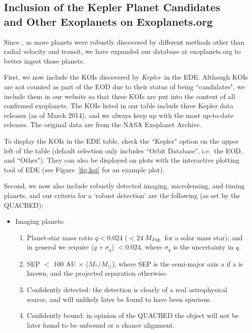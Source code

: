 \documentclass[11pt,preprint]{aastex}
\def\kepler{\textit{Kepler}}
\def\mjup{$M_{\rm Jup}$}
\begin{document}
\begin{CJK*}{UTF8}{gbsn}
\section{Inclusion of the Kepler Planet Candidates \\
  and Other Exoplanets on Exoplanets.org}\label{sec:kepler}

Since \cite{Wright2011}, as more planets were robustly discovered by
different methods other than radial velocity and transit, we have
expanded our database at exoplanets.org to better ingest those
planets.

First, we now include the KOIs discovered by \kepler\ in the
EDE. Although KOIs are not counted as part of the EOD due to their
status of being ``candidates", we include them in our website so that
these KOIs are put into the context of all confirmed exoplanets. The
KOIs listed in our table include three Kepler data releases (as of
March 2014), and we always keep up with the most up-to-date
releases. The original data are from the NASA Exoplanet Archive.

To display the KOIs in the EDE table, check the ``Kepler" option on
the upper left of the table (default selection only includes ``Orbit
Database", i.e.~the EOD, and ``Other"). They can also be displayed on
plots with the interactive plotting tool of EDE (see
Figure~\ref{fig:koi} for an example plot).

Second, we now also include
robustly detected imaging, microlensing, and timing planets, and our
criteria for a `robust detection' are the following (as set by the
QUACBED):

\begin{itemize}
\item Imaging planets:
\begin{enumerate}
\item Planet-star mass ratio $q < 0.024$ ($< 24\ $\mjup\ for a solar
  mass star); and in general we require ($q+\sigma_q$) $< 0.024$,
  where $\sigma_q$ is the uncertainty in $q$.
\item SEP $<$ 100 AU $\times$ ($M_*/M_\odot$), where SEP is the
  semi-major axis a if a is known, and the projected separation
  otherwise.
\item Confidently detected: the detection is clearly of a real
  astrophysical source, and will unlikely later be found to have been
  spurious.
\item Confidently bound: in opinion of the QUACBED the object will not
  be later found to be unbound or a chance alignment.


\end{enumerate}
\end{itemize}
\end{CJK*}
\end{document}
